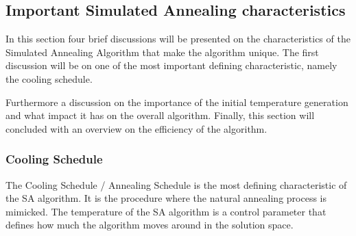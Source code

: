 \subsection{Important Simulated Annealing characteristics}
In this section four brief discussions will be presented on the characteristics of the Simulated Annealing Algorithm that make the algorithm unique. The first discussion will be on one of the most important defining characteristic, namely the cooling schedule. 

Furthermore a discussion on the importance of the initial temperature generation and what impact it has on the overall algorithm. Finally, this section will concluded with an overview on the efficiency of the algorithm.

\subsubsection{Cooling Schedule}
The Cooling Schedule / Annealing Schedule is the most defining characteristic of the SA algorithm. It is the procedure where the natural annealing process is mimicked. The temperature of the SA algorithm is a control parameter that defines how much the algorithm moves around in the solution space.

